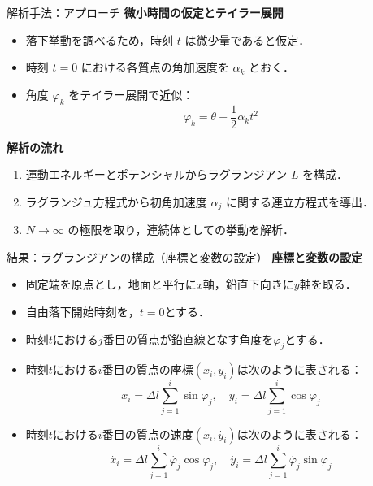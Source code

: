 \documentclass[11pt, unicode, aspectratio=169]{beamer}
\begin{document}
\begin{frame}{解析手法：アプローチ}
  \textbf{微小時間の仮定とテイラー展開}
  \begin{itemize}
    \item 落下挙動を調べるため，時刻 $t$ は微少量であると仮定．
    \item 時刻 $t=0$ における各質点の角加速度を $\alpha_k$ とおく．
    \item 角度 $\varphi_k$ をテイラー展開で近似：
      \begin{equation}
        \varphi_k = \theta + \frac{1}{2} \alpha_k t^2
      \end{equation}
  \end{itemize}
  \vspace{1em}
  
  \textbf{解析の流れ}
  \begin{enumerate}
    \item 運動エネルギーとポテンシャルからラグランジアン $L$ を構成．
    \item ラグランジュ方程式から初角加速度 $\alpha_j$ に関する連立方程式を導出．
    \item $N \rightarrow \infty$ の極限を取り，連続体としての挙動を解析．
  \end{enumerate}
\end{frame}

\begin{frame}{結果：ラグランジアンの構成（座標と変数の設定）}
  \textbf{座標と変数の設定}
  \begin{itemize}
    \item 固定端を原点とし，地面と平行に$x$軸，鉛直下向きに$y$軸を取る．
    \item 自由落下開始時刻を，$t = 0$とする．
    \item 時刻$t$における$j$番目の質点が鉛直線となす角度を$\varphi_j$とする．
    \item 時刻$t$における$i$番目の質点の座標$\left(x_i, y_i\right)$は次のように表される：
      \begin{equation}
        x_i = \Delta l \sum_{j = 1}^{i} \sin \varphi_j, \quad y_i = \Delta l \sum_{j = 1}^{i} \cos \varphi_j
      \end{equation}
    \item 時刻$t$における$i$番目の質点の速度$\left(\dot{x_i}, \dot{y_i}\right)$は次のように表される：
      \begin{equation}
        \dot{x_i} = \Delta l \sum_{j = 1}^{i} \dot{\varphi_j} \cos \varphi_j,\quad \dot{y_i} = \Delta l \sum_{j = 1}^{i} \dot{\varphi_j} \sin \varphi_j
      \end{equation}
  \end{itemize}
\end{frame}
\end{document}

